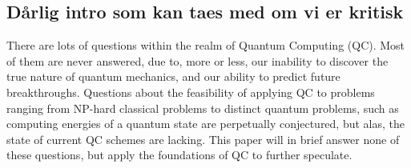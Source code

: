 
\subsection{Dårlig intro som kan taes med om vi er kritisk}
There are lots of questions within the realm of Quantum Computing (QC). Most of them are never answered, due to, more or less, our inability to discover the true nature of quantum mechanics, and our ability to predict future breakthroughs. Questions about the feasibility of applying QC to problems ranging from NP-hard classical problems to distinct quantum problems, such as computing energies of a quantum state are perpetually conjectured, but alas, the state of current QC schemes are lacking. This paper will in brief answer none of these questions, but apply the foundations of QC to further speculate.
